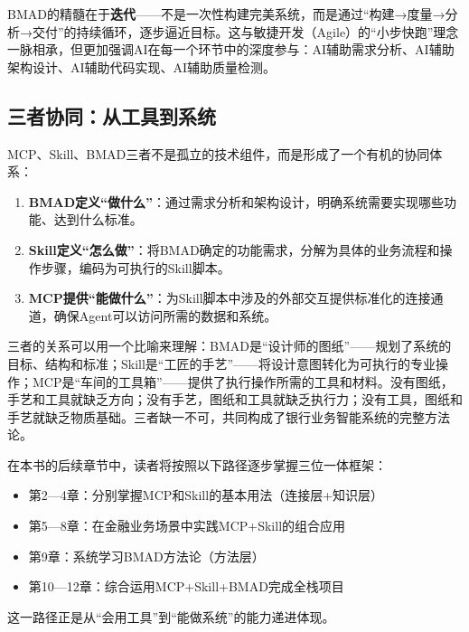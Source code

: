 BMAD的精髓在于\textbf{迭代}——不是一次性构建完美系统，而是通过``构建→度量→分析→交付''的持续循环，逐步逼近目标。这与敏捷开发（Agile）的``小步快跑''理念一脉相承，但更加强调AI在每一个环节中的深度参与：AI辅助需求分析、AI辅助架构设计、AI辅助代码实现、AI辅助质量检测。

\subsection{三者协同：从工具到系统}

MCP、Skill、BMAD三者不是孤立的技术组件，而是形成了一个有机的协同体系：

\begin{enumerate}[leftmargin=2em]
  \item \textbf{BMAD定义``做什么''}：通过需求分析和架构设计，明确系统需要实现哪些功能、达到什么标准。
  \item \textbf{Skill定义``怎么做''}：将BMAD确定的功能需求，分解为具体的业务流程和操作步骤，编码为可执行的Skill脚本。
  \item \textbf{MCP提供``能做什么''}：为Skill脚本中涉及的外部交互提供标准化的连接通道，确保Agent可以访问所需的数据和系统。
\end{enumerate}

三者的关系可以用一个比喻来理解：BMAD是``设计师的图纸''——规划了系统的目标、结构和标准；Skill是``工匠的手艺''——将设计意图转化为可执行的专业操作；MCP是``车间的工具箱''——提供了执行操作所需的工具和材料。没有图纸，手艺和工具就缺乏方向；没有手艺，图纸和工具就缺乏执行力；没有工具，图纸和手艺就缺乏物质基础。三者缺一不可，共同构成了银行业务智能系统的完整方法论。

\begin{notebox}[本书的实践路径]
在本书的后续章节中，读者将按照以下路径逐步掌握三位一体框架：
\begin{itemize}[leftmargin=1.5em]
  \item 第2—4章：分别掌握MCP和Skill的基本用法（连接层+知识层）
  \item 第5—8章：在金融业务场景中实践MCP+Skill的组合应用
  \item 第9章：系统学习BMAD方法论（方法层）
  \item 第10—12章：综合运用MCP+Skill+BMAD完成全栈项目
\end{itemize}
这一路径正是从``会用工具''到``能做系统''的能力递进体现。
\end{notebox}


